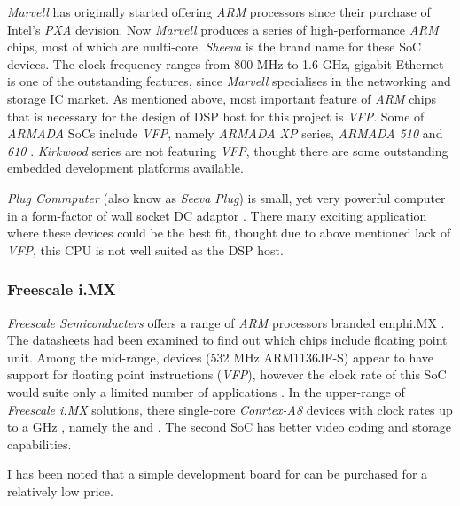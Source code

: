   \emph{Marvell} has originally started offering \emph{ARM} processors
 since their purchase of Intel's \emph{PXA} devision. Now \emph{Marvell}
 produces a series of high-performance \emph{ARM} chips, most of which
 are multi-core. \emph{Sheeva} is the brand name for these SoC devices.
 The clock frequency ranges from 800 MHz to 1.6 GHz, gigabit Ethernet
 is one of the outstanding features, since \emph{Marvell} specialises
 in the networking and storage IC market. As mentioned above, most
 important feature of \emph{ARM} chips that is necessary for the design
 of DSP host for this project is \emph{VFP}. Some of \emph{ARMADA}
 SoCs include \emph{VFP}, namely \emph{ARMADA XP} series,
 \emph{ARMADA 510} and \emph{610} \cite{links:marvell:armada}.
 \emph{Kirkwood} series are not featuring \emph{VFP}, thought there
 are some outstanding embedded development platforms available.

  \emph{Plug Commputer} (also know as \emph{Seeva Plug}) is small, yet
 very powerful computer in a form-factor of wall socket DC adaptor
 \cite{links:marvell:plug,links:plugcomp:homepage}. There many exciting
 application where these devices could be the best fit, thought due to
 above mentioned lack of \emph{VFP}, this CPU is not well suited as the
 DSP host.


\subsubsection{Freescale i.MX}

 \emph{Freescale Semiconducters} offers a range of \emph{ARM} processors
 branded emph{i.MX} \cite{links:freescale:imx}. The datasheets had been
 examined to find out which chips include floating point unit. Among the
 mid-range,  devices (532 MHz ARM1136JF-S) appear to have
 support for floating point instructions (\emph{VFP}), however the clock
 rate of this SoC would suite only a limited number of applications
 \cite{links:freescale:imx31}. In the upper-range of \emph{Freescale i.MX}
 solutions, there single-core \emph{Conrtex-A8} devices with clock rates
 up to a GHz \cite{links:freescale:imx5}, namely the   and
 . The second SoC has better video coding and storage
 capabilities.

 I has been noted that a simple development board for  can
 be purchased for a relatively low price.

